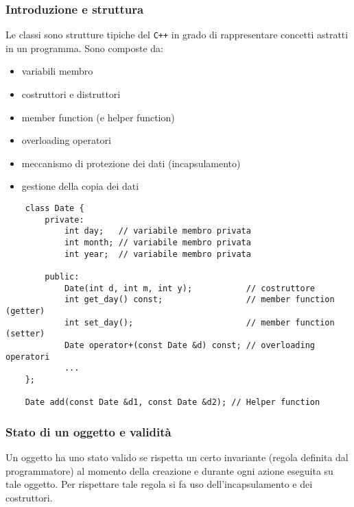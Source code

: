 \documentclass[a4paper]{article}
\begin{document}
\subsubsection*{Introduzione e struttura}
Le classi sono strutture tipiche del \verb|C++| in grado di rappresentare concetti astratti in un programma. Sono composte da:
\begin{itemize}[topsep=0pt]
	\item variabili membro
	\item costruttori e distruttori
	\item member function (e helper function)
	\item overloading operatori
	\item meccanismo di protezione dei dati (incapsulamento)
	\item gestione della copia dei dati 
\end{itemize}
\begin{lstlisting}
	class Date {
		private:
			int day;   // variabile membro privata
			int month; // variabile membro privata
			int year;  // variabile membro privata

		public:
			Date(int d, int m, int y);           // costruttore
			int get_day() const;                 // member function (getter)
			int set_day();                       // member function (setter)
			Date operator+(const Date &d) const; // overloading operatori
			...
	};

	Date add(const Date &d1, const Date &d2); // Helper function
\end{lstlisting}

\subsubsection*{Stato di un oggetto e validità}
Un oggetto ha uno stato valido se rispetta un certo invariante (regola definita dal programmatore) al momento della creazione e
durante ogni azione eseguita su tale oggetto. Per rispettare tale regola si fa uso dell'incapsulamento e dei costruttori.

\newpage
\end{document}
